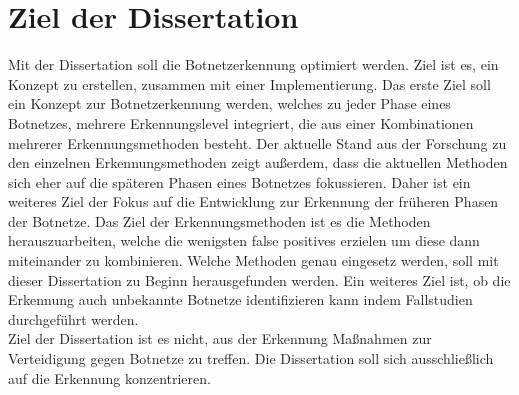 \section{Ziel der Dissertation}
\label{sec:goals}

Mit der Dissertation soll die Botnetzerkennung optimiert werden. Ziel ist es, ein Konzept zu erstellen, zusammen mit einer Implementierung.
Das erste Ziel soll ein Konzept zur Botnetzerkennung werden, welches zu jeder Phase eines Botnetzes, mehrere Erkennungslevel integriert, die aus einer Kombinationen 
mehrerer Erkennungsmethoden besteht. Der aktuelle Stand aus der Forschung zu den einzelnen Erkennungsmethoden zeigt außerdem, dass die aktuellen Methoden sich eher 
auf die späteren Phasen eines Botnetzes fokussieren. Daher ist ein weiteres Ziel der Fokus auf die Entwicklung zur Erkennung der früheren Phasen der Botnetze.
Das Ziel der Erkennungsmethoden ist es die Methoden herauszuarbeiten, welche die wenigsten false positives erzielen um diese dann miteinander zu kombinieren. Welche 
Methoden genau eingesetz werden, soll mit dieser Dissertation zu Beginn herausgefunden werden. Ein weiteres Ziel ist, ob die Erkennung auch unbekannte Botnetze 
identifizieren kann indem Fallstudien durchgeführt werden. \\ Ziel der Dissertation ist es nicht, aus der Erkennung Maßnahmen zur Verteidigung gegen Botnetze zu treffen. 
Die Dissertation soll sich ausschließlich auf die Erkennung konzentrieren. 